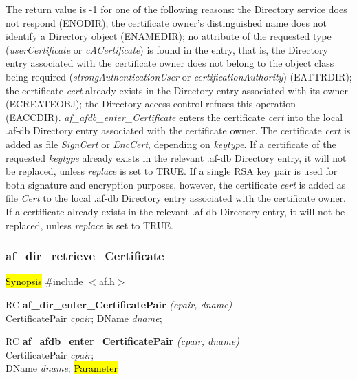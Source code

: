 The return value is -1 for one of the following reasons:
\bi
\m the Directory service does not respond (ENODIR);
\m the certificate owner's distinguished name does not identify a Directory object (ENAMEDIR);
\m no attribute of the requested type ({\em userCertificate} or {\em cACertificate}) is found 
in the entry, that is, the Directory entry associated with the certificate owner does not
belong to the object class being required ({\em strongAuthenticationUser} or 
{\em certificationAuthority}) (EATTRDIR);
\m the certificate {\em cert} already exists in the Directory entry associated with 
its owner (ECREATEOBJ);
\m the Directory access control refuses this operation (EACCDIR).
\ei
{\em af\_afdb\_enter\_Certificate} enters the certificate {\em cert} into the local .af-db
Directory 
entry associated with the certificate owner. The certificate {\em cert} is added as file {\em SignCert}
or {\em EncCert}, depending on {\em keytype}. If a certificate of the requested {\em keytype} already
exists in the relevant .af-db Directory entry, it will not be replaced, unless {\em replace} is set to TRUE.
If a single RSA key pair is used for both signature and encryption purposes, however, the certificate {\em cert} is added as
file {\em Cert} to the local .af-db Directory entry associated with the certificate owner. If a certificate already
exists in the relevant .af-db Directory entry, it will not be replaced, unless {\em replace} is set to TRUE.



\subsubsection{af\_dir\_retrieve\_Certificate}
\hl{Synopsis}
\#include $<$af.h$>$ 

RC {\bf af\_dir\_enter\_CertificatePair} {\em (cpair, dname)} \\
CertificatePair {\em *cpair};
DName {\em *dname};

RC {\bf af\_afdb\_enter\_CertificatePair} {\em (cpair, dname)} \\
CertificatePair {\em *cpair}; \\ 
DName {\em *dname};
\hl{Parameter}


